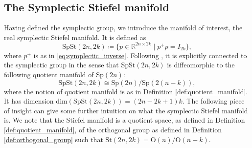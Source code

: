 \subsection{The Symplectic Stiefel manifold}
Having defined the symplectic group, we introduce the manifold of interest, the real symplectic Stiefel manifold. It is defined as
\begin{equation}\label{eq:spst_def}
    \mathrm{SpSt}(2n, 2k)\coloneqq \{p\in \mathbb{R}^{2n\times2k} \;|\; p^{+}p=I_{2k}\},
\end{equation}
where $p^{+}$ is as in \eqref{eq:symplectic_inverse}. Following \cite[Prop.~3.1]{BendokatZimmermann2021}, it is explicitly connected to the symplectic group in the sense that $\mathrm{SpSt}(2n, 2k)$ is diffeomorphic to the following quotient manifold of $\mathrm{Sp}(2n)$:
\begin{equation*}
    \mathrm{SpSt}(2n, 2k)\cong \mathrm{Sp}(2n)/\mathrm{Sp}(2(n-k)),
\end{equation*}
where the notion of quotient manifold is as in Definition \ref{def:quotient_manifold}. It has dimension $\mathrm{dim}(\mathrm{SpSt}(2n, 2k))=(2n-2k+1)k$. The following piece of insight can give some further intuition on what the symplectic Stiefel manifold is. We note that the Stiefel manifold is a quotient space, as defined in Definition \ref{def:quotient_manifold}, of the orthogonal group as defined in Definition \ref{def:orthogonal_group} such that $\mathrm{St}(2n, 2k)=\mathrm{O}(n)/\mathrm{O}(n-k)$. 

